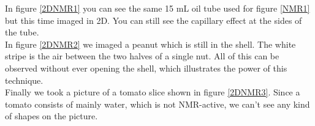 In figure \ref{2DNMR1} you can see the same 15 mL oil tube used for figure \ref{NMR1} but this time imaged in 2D. You can still see the capillary effect at the sides of the tube. \\
In figure \ref{2DNMR2} we imaged a peanut which is still in the shell. The white stripe is the air between the two halves of a single nut. All of this can be observed without ever opening the shell, which illustrates the power of this technique. \\
Finally we took a picture of a tomato slice shown in figure \ref{2DNMR3}. Since a tomato consists of mainly water,  which is not NMR-active, we can't see any kind of shapes on the picture. \\